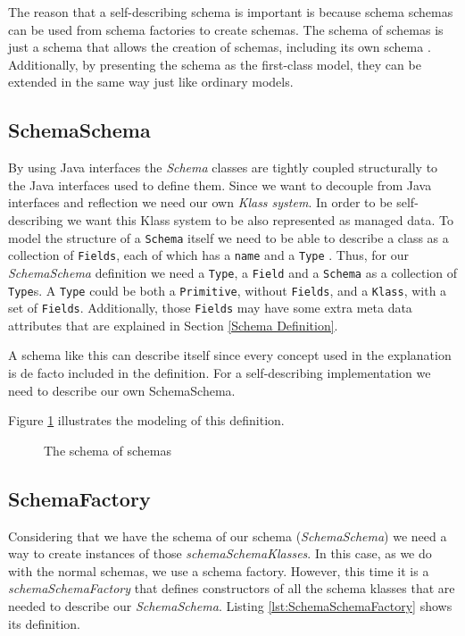 The reason that a self-describing schema is important is because schema schemas can be used from schema factories to create schemas.
The schema of schemas is just a schema that allows the creation of schemas, including its own schema \cite{storm2012object}.
Additionally, by presenting the schema as the first-class model\cite{kurtev2006model}, they can be extended in the same way just like ordinary models.

\subsection{SchemaSchema}\label{sec:SchemaSchema}
By using Java interfaces the \textit{Schema} classes are tightly coupled structurally to the Java interfaces used to define them.
Since we want to decouple from Java interfaces and reflection we need our own \textit{Klass system}.
In order to be self-describing we want this Klass system to be also represented as managed data. 
To model the structure of a \texttt{Schema} itself we need to be able to describe a class as a collection of \texttt{Fields}, each of which has a \texttt{name} and a \texttt{Type} \cite{loh2012managed}. 
Thus, for our \textit{SchemaSchema} definition we need a \texttt{Type}, a \texttt{Field} and a \texttt{Schema} as a collection of \texttt{Type}s. 
A \texttt{Type} could be both a \texttt{Primitive}, without \texttt{Fields}, and a \texttt{Klass}, with a set of \texttt{Fields}.
Additionally, those \texttt{Fields} may have some extra meta data attributes that are explained in Section \ref{Schema Definition}.

A schema like this can describe itself since every concept used in the explanation is de facto included in the definition.
For a self-describing implementation we need to describe our own SchemaSchema. 

Figure \ref{fig:SchemaSchema_definition} illustrates the modeling of this definition.

\begin{figure}[H]
	\centering
  	\caption{The schema of schemas}
  	\label{fig:SchemaSchema_definition}
\end{figure}

\subsection{SchemaFactory}\label{sec:SchemaFactory}
Considering that we have the schema of our schema (\textit{SchemaSchema}) we need a way to create instances of those \textit{schemaSchemaKlasses}.
In this case, as we do with the normal schemas, we use a schema factory. 
However, this time it is a \textit{schemaSchemaFactory} that defines constructors of all the schema klasses that are needed to describe our \textit{SchemaSchema}.
Listing \ref{lst:SchemaSchemaFactory} shows its definition.

